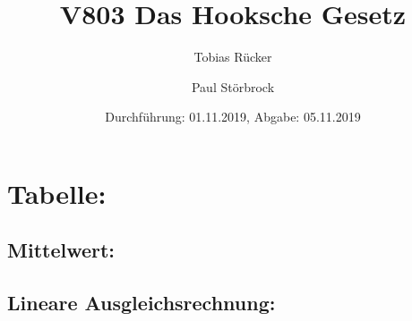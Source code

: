 

\title{V803 Das Hooksche Gesetz}
\author{Tobias Rücker \and Paul Störbrock}
\date{Durchführung: 01.11.2019, Abgabe: 05.11.2019}


\maketitle


\newpage
\section{Tabelle:}   
\begin{table}
    \centering
    \label{tab:data}
       
\end{table}
    \subsection{Mittelwert:}
    \subsection{Lineare Ausgleichsrechnung:}

